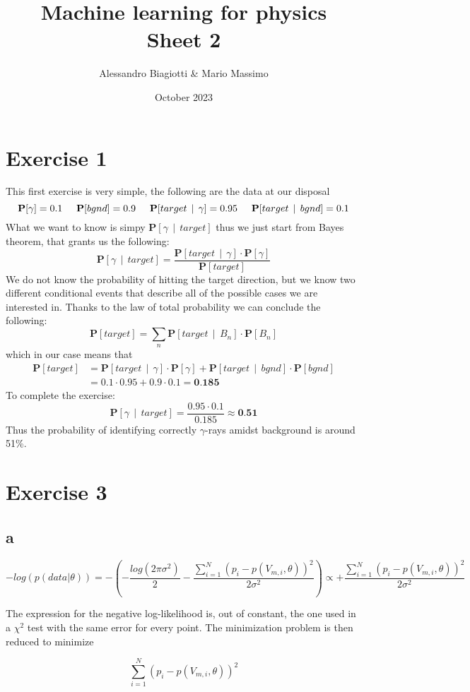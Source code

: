 \documentclass{article}
\title{Machine learning for physics \\ \large Sheet 2}
\author{Alessandro Biagiotti \& Mario Massimo}
\date{October 2023}
\newcommand{\spc}{\:\:}
\newcommand{\prob}[1]{\textbf{P}[#1]}
\newcommand{\cprob}[2]{\prob{#1 \spc | \spc #2}}
\begin{document}
\maketitle
\section{Exercise 1}
This first exercise is very simple, the following are the data at our disposal
\begin{equation*}
    \prob{\gamma} = 0.1 \hspace{0.5cm} 
    \prob{bgnd} = 0.9 \hspace{0.5cm}
    \cprob{target}{\gamma} = 0.95 \hspace{0.5cm}
    \cprob{target}{bgnd} = 0.1
\end{equation*}
What we want to know is simpy $\cprob{\gamma}{target}$ thus we just start from Bayes theorem, that grants us the following:
\begin{equation}
    \cprob{\gamma}{target} = \frac{\cprob{target}{\gamma} \cdot \prob{\gamma}}{\prob{target}}
\end{equation}
We do not know the probability of hitting the target direction, but we know two different conditional events that describe all of the possible cases we are interested in. Thanks to the law of total probability we can conclude the following:
\begin{equation}
    \prob{target} = \sum_n{\cprob{target}{B_n} \cdot \prob{B_n}}
\end{equation}
which in our case means that
\begin{align*}
    \prob{target} &= \cprob{target}{\gamma} \cdot \prob{\gamma} + \cprob{target}{bgnd} \cdot \prob{bgnd} \\
    &= 0.1 \cdot 0.95 + 0.9 \cdot 0.1 = \textbf{0.185}
\end{align*}
To complete the exercise:
\begin{equation*}
    \cprob{\gamma}{target} = \frac{0.95 \cdot 0.1}{0.185} \approx \textbf{0.51}
\end{equation*}
Thus the probability of identifying correctly $\gamma$-rays amidst background is around 51\%.
\pagebreak
\section{Exercise 3}
\subsection{a}
\begin{equation*}
    - log(p(data|\theta))= - \left(-\frac{log(2\pi \sigma^2)}{2} - \frac{\sum_{i=1}^N (p_i - p(V_{m,i},\theta))^2}{2 \sigma^2}\right) \propto 
   + \frac{\sum_{i=1}^N (p_i - p(V_{m,i},\theta))^2}{2 \sigma^2}
\end{equation*}

The expression for the negative log-likelihood is, out of constant, the one used in a $\chi^2$ test with the same error for every point. The minimization problem is then reduced to minimize

\begin{equation*}
    \sum_{i=1}^N (p_i - p(V_{m,i},\theta))^2
\end{equation*}
    
\end{document}
